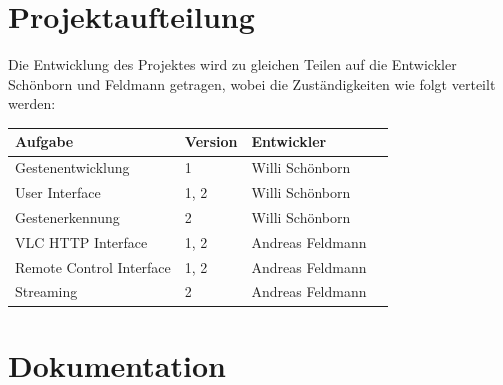 \documentclass[a4paper,12pt]{article}
\begin{document}
\section{Projektaufteilung}
Die Entwicklung des Projektes wird zu gleichen Teilen auf die Entwickler Schönborn und Feldmann getragen, wobei die Zuständigkeiten wie folgt verteilt werden:

\begin{table}[h!b!p!]
\begin{tabular*}{\textwidth}{ l l l l }
	\toprule
\textbf{Aufgabe} & \textbf{Version} & \textbf{Entwickler} \\
	\midrule
	Gestenentwicklung & 1 & Willi Schönborn  \\ 
	User Interface & 1, 2 & Willi Schönborn \\
	Gestenerkennung & 2 & Willi Schönborn \\
	VLC HTTP Interface & 1, 2 & Andreas Feldmann \\
	Remote Control Interface & 1, 2 & Andreas Feldmann \\
	Streaming & 2 & Andreas Feldmann \\
	\bottomrule
\end{tabular*}
\end{table}

\newpage

\section{Dokumentation}
\end{document}
